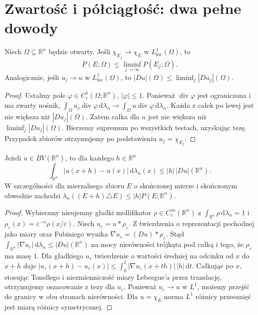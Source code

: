 \section{Zwartość i półciągłość: dwa pełne dowody}
\begin{twierdzenie}
\label{thm:perimeter-lsc-29}
Niech $\Omega\subseteq\mathbb R^n$ będzie otwarty.
Jeśli $\chi_{E_j}\to\chi_E$ w
$L^1_{\mathrm{loc}}(\Omega)$, to
\[
 P(E;\Omega)\le\liminf_{j\to\infty}P(E_j;\Omega).
\]
Analogicznie, jeśli $u_j\to u$ w
$L^1_{\mathrm{loc}}(\Omega)$, to
$|Du|(\Omega)\le\liminf_j|Du_j|(\Omega)$.
\end{twierdzenie}
\begin{proof}
Ustalmy pole $\varphi\in C_c^1(\Omega;\mathbb R^n)$,
$|\varphi|\le1$. Ponieważ $\operatorname{div}\varphi$
jest ograniczona i ma zwarty nośnik,
$\int_\Omega u_j\operatorname{div}\varphi
\,\mathrm d\lambda_n\to\int_\Omega u\operatorname{div}\varphi
\,\mathrm d\lambda_n$.
Każda z całek po lewej jest nie większa niż
$|Du_j|(\Omega)$. Zatem całka dla $u$
jest nie większa niż $\liminf_j|Du_j|(\Omega)$.
Bierzemy supremum po wszystkich testach,
uzyskując tezę. Przypadek zbiorów otrzymujemy
po podstawieniu $u_j=\chi_{E_j}$.
\end{proof}

\begin{lemat}
\label{lem:BV-translation-29}
Jeżeli $u\in BV(\mathbb R^n)$, to dla każdego
$h\in\mathbb R^n$
\[
 \int_{\mathbb R^n}|u(x+h)-u(x)|
 \,\mathrm d\lambda_n(x)\le|h|\,|Du|(\mathbb R^n).
\]
W szczególności dla mierzalnego zbioru $E$ o
skończonej mierze i skończonym obwodzie zachodzi
$\lambda_n((E+h)\triangle E)\le|h|P(E;\mathbb R^n)$.
\end{lemat}
\begin{proof}
Wybierzmy nieujemny gładki mollifikator
$\rho\in C_c^\infty(\mathbb R^n)$ z
$\int_{\mathbb R^n}\rho\,\mathrm d\lambda_n=1$ i
$\rho_\varepsilon(x)=\varepsilon^{-n}\rho(x/\varepsilon)$.
Niech $u_\varepsilon=u*\rho_\varepsilon$.
Z twierdzenia o reprezentacji pochodnej jako miary
oraz Fubiniego wynika
$\nabla u_\varepsilon=(Du)*\rho_\varepsilon$.
Stąd
$\int_{\mathbb R^n}|\nabla u_\varepsilon|\,\mathrm d\lambda_n
\le|Du|(\mathbb R^n)$ na mocy nierówności trójkąta
pod całką i tego, że $\rho_\varepsilon$ ma masę $1$.
Dla gładkiego $u_\varepsilon$ twierdzenie o wartości
średniej na odcinku od $x$ do $x+h$ daje
$|u_\varepsilon(x+h)-u_\varepsilon(x)|
\le\int_0^1|\nabla u_\varepsilon(x+th)|\,|h|\,\mathrm dt$.
Całkując po $x$, stosując Tonellego i niezmienniczość
miary Lebesgue'a przez translację, otrzymujemy
oszacowanie z tezy dla $u_\varepsilon$.
Ponieważ $u_\varepsilon\to u$ w $L^1$,
możemy przejść do granicy w obu stronach nierówności.
Dla $u=\chi_E$ norma $L^1$ różnicy przesunięć
jest miarą różnicy symetrycznej.
\end{proof}

